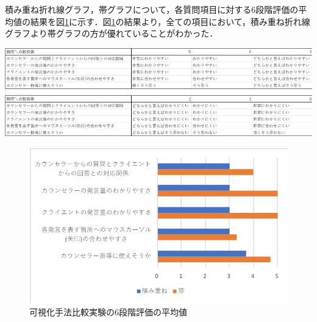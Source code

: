 \documentclass[shuuron]{kuee}
\begin{document}
積み重ね折れ線グラフ，帯グラフについて，各質問項目に対する6段階評価の平均値の結果を図\ref{fig:keijouAnketo}に示す．図\ref{fig:keijouAnketo}の結果より，全ての項目において，積み重ね折れ線グラフより帯グラフの方が優れていることがわかった．

\begin{table}
  \caption{可視化手法比較アンケートにおける6段階評価質問}
  \label{table:keijouAnketo}
  \begin{center}
    \includegraphics[width=\linewidth]{point.png}
  \end{center}
\end{table}

\begin{figure}
  \begin{center}
    \includegraphics[width=\linewidth]{keijouAnketo.png}
  \end{center}
  \caption{可視化手法比較実験の6段階評価の平均値}
  \label{fig:keijouAnketo}
\end{figure}
\end{document}
